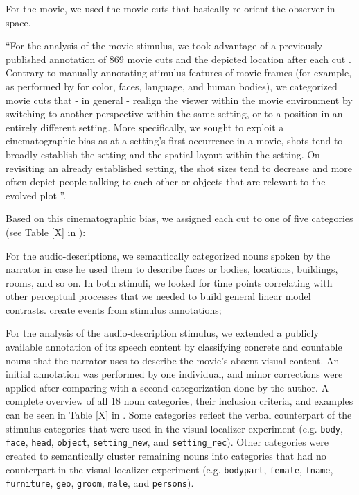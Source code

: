 %
For the movie, we used the movie cuts that basically re-orient the observer in
space.

``For the analysis of the movie stimulus, we took advantage of a previously
published annotation of 869 movie cuts and the depicted location after each cut
\citep{haeusler2016cutanno}.
Contrary to manually annotating stimulus features of movie frames (for example,
as performed by \citet{bartels2004mapping} for color, faces, language, and human
bodies), we categorized movie cuts that - in general - realign the viewer within
the movie environment by switching to another perspective within the same
setting, or to a position in an entirely different setting.
More specifically, we sought to exploit a cinematographic bias as
at a setting's first occurrence in a movie, shots tend to broadly establish the
setting and the spatial layout within the setting.
On revisiting an already established setting, the shot sizes tend to decrease
and more often depict people talking to each other or objects that are relevant
to the evolved plot
\citep{brown2012cinematography, katz1991film, mascelli1998five}''.

Based on this cinematographic bias, we assigned each cut to one of five
categories (see Table [X] in \citep{haeusler2022processing}):
%




%
For the audio-descriptions, we semantically categorized nouns spoken by the
narrator in case he used them to describe faces or bodies, locations, buildings,
rooms, and so on.
%
In both stimuli, we looked for time points correlating with other perceptual
processes that we needed to build general linear model contrasts.
%
create events from stimulus annotations;

For the analysis of the audio-description stimulus, we extended a publicly
available annotation of its speech content \citep{haeusler2021studyforrest} by
classifying concrete and countable nouns that the narrator uses to describe the
movie's absent visual content.
An initial annotation was performed by one individual,
and minor corrections were applied after comparing with a second categorization
done by the author.
A complete overview of all 18 noun categories, their inclusion criteria, and
examples can be seen in Table [X] in \citep{haeusler2022processing}.
Some categories reflect the verbal counterpart of the stimulus categories that
were used in the visual localizer experiment (e.g. \texttt{body}, \texttt{face},
\texttt{head}, \texttt{object}, \texttt{setting\_new}, and
\texttt{setting\_rec}).
Other categories were created to semantically cluster remaining nouns into
categories that had no counterpart in the visual localizer experiment (e.g.
\texttt{bodypart}, \texttt{female}, \texttt{fname}, \texttt{furniture},
\texttt{geo}, \texttt{groom}, \texttt{male}, and \texttt{persons}).



